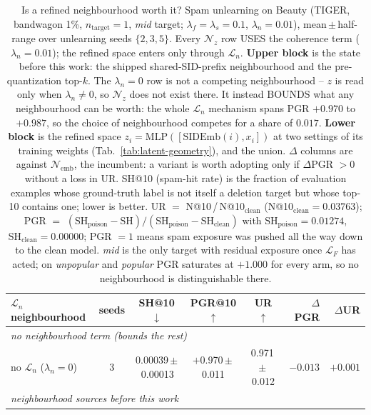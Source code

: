 \begin{table}[t]
\centering
\small
\caption{Is a refined neighbourhood worth it? Spam unlearning on Beauty (TIGER, bandwagon 1\%, $n_{\text{target}}{=}1$, \emph{mid} target; $\lambda_f{=}\lambda_s{=}0.1$, $\lambda_n{=}0.01$), mean\,$\pm$\,half-range over unlearning seeds $\{2,3,5\}$. Every $\mathcal{N}_z$ row USES the coherence term ($\lambda_n{=}0.01$); the refined space enters only through $\mathcal{L}_n$. \textbf{Upper block} is the state before this work: the shipped shared-SID-prefix neighbourhood and the pre-quantization top-$k$. The $\lambda_n{=}0$ row is not a competing neighbourhood -- $z$ is read only when $\lambda_n\neq0$, so $\mathcal{N}_z$ does not exist there. It instead BOUNDS what any neighbourhood can be worth: the whole $\mathcal{L}_n$ mechanism spans PGR $+0.970$ to $+0.987$, so the choice of neighbourhood competes for a share of $0.017$. \textbf{Lower block} is the refined space $z_i=\mathrm{MLP}([\mathrm{SIDEmb}(i),x_i])$ at two settings of its training weights (Tab.~\ref{tab:latent-geometry}), and the union. $\Delta$ columns are against $\mathcal{N}_{\text{emb}}$, the incumbent: a variant is worth adopting only if $\Delta$PGR $>0$ without a loss in UR. SH@10 (spam-hit rate) is the fraction of evaluation examples whose ground-truth label is not itself a deletion target but whose top-10 contains one; lower is better. UR $=$ N@10\,/\,N@10$_{\text{clean}}$ (N@10$_{\text{clean}}=0.03763$); PGR $=$ $(\text{SH}_{\text{poison}}{-}\text{SH})/(\text{SH}_{\text{poison}}{-}\text{SH}_{\text{clean}})$ with $\text{SH}_{\text{poison}}=0.01274$, $\text{SH}_{\text{clean}}=0.00000$; PGR $=1$ means spam exposure was pushed all the way down to the clean model. \emph{mid} is the only target with residual exposure once $\mathcal{L}_F$ has acted; on \emph{unpopular} and \emph{popular} PGR saturates at $+1.000$ for every arm, so no neighbourhood is distinguishable there.}
\label{tab:latent-unlearn}
\begin{tabular}{lccccrr}
\toprule
$\mathcal{L}_n$ neighbourhood & seeds & SH@10 $\downarrow$ & PGR@10 $\uparrow$ & UR $\uparrow$ & $\Delta$PGR & $\Delta$UR \\
\midrule
\multicolumn{7}{l}{\textit{no neighbourhood term (bounds the rest)}} \\
no $\mathcal{L}_n$ ($\lambda_n{=}0$) & 3 & 0.00039\,$\pm$\,0.00013 & $+$0.970\,$\pm$\,0.011 & 0.971\,$\pm$\,0.012 & $-0.013$ & $+0.001$ \\
\midrule
\multicolumn{7}{l}{\textit{neighbourhood sources before this work}} \\

\end{tabular}
\end{table}
